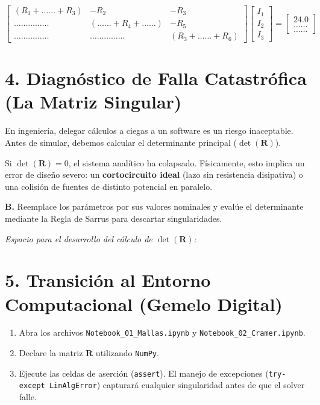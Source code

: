 \documentclass[11pt,a4paper]{article}
\begin{document}
$$
\begin{bmatrix}
 (R_1 + \dots \dots + R_3) & -R_2 & -R_3 \\
 \dots \dots \dots \dots \dots & (\dots \dots + R_4 + \dots \dots) & -R_5 \\
 \dots \dots \dots \dots \dots & \dots \dots \dots \dots \dots & (R_3 + \dots \dots + R_6)
\end{bmatrix}
\begin{bmatrix}
 I_1 \\
 I_2 \\
 I_3
\end{bmatrix}
=
\begin{bmatrix}
 24.0 \\
 \dots \dots \\
 \dots \dots
\end{bmatrix}
$$

\vspace{0.5cm}

\section*{4. Diagnóstico de Falla Catastrófica (La Matriz Singular)}
En ingeniería, delegar cálculos a ciegas a un software es un riesgo inaceptable. Antes de simular, debemos calcular el determinante principal ($\det(\mathbf{R})$). 

Si $\det(\mathbf{R}) = 0$, el sistema analítico ha colapsado. Físicamente, esto implica un error de diseño severo: un \textbf{cortocircuito ideal} (lazo sin resistencia disipativa) o una colisión de fuentes de distinto potencial en paralelo. 

\textbf{B.} Reemplace los parámetros por sus valores nominales y evalúe el determinante mediante la Regla de Sarrus para descartar singularidades.

\vspace{0.3cm}
\begin{tcolorbox}[colback=white,colframe=UCBred,height=4cm,valign=top]
\textit{Espacio para el desarrollo del cálculo de $\det(\mathbf{R})$:}
\end{tcolorbox}

\section*{5. Transición al Entorno Computacional (Gemelo Digital)}
\begin{enumerate}[label=\textbf{\arabic*.}]
    \item Abra los archivos \texttt{Notebook\_01\_Mallas.ipynb} y \texttt{Notebook\_02\_Cramer.ipynb}.
    \item Declare la matriz $\mathbf{R}$ utilizando \texttt{NumPy}.
    \item Ejecute las celdas de aserción (\texttt{assert}). El manejo de excepciones (\texttt{try-except LinAlgError}) capturará cualquier singularidad antes de que el solver falle.
\end{enumerate}
\end{document}
